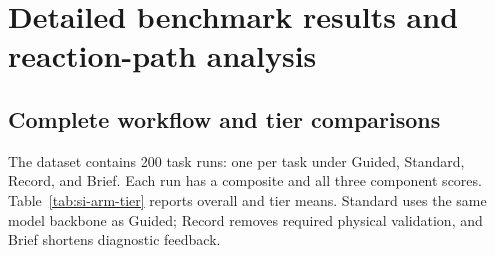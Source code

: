 \section{Detailed benchmark results and reaction-path analysis}
\label{sec:si-detailed-results}



\subsection{Complete workflow and tier comparisons}

The dataset contains 200 task runs: one per task under Guided, Standard, Record, and Brief. Each run has a composite and all three component scores. Table~\ref{tab:si-arm-tier} reports overall and tier means. Standard uses the same model backbone as Guided; Record removes required physical validation, and Brief shortens diagnostic feedback.

